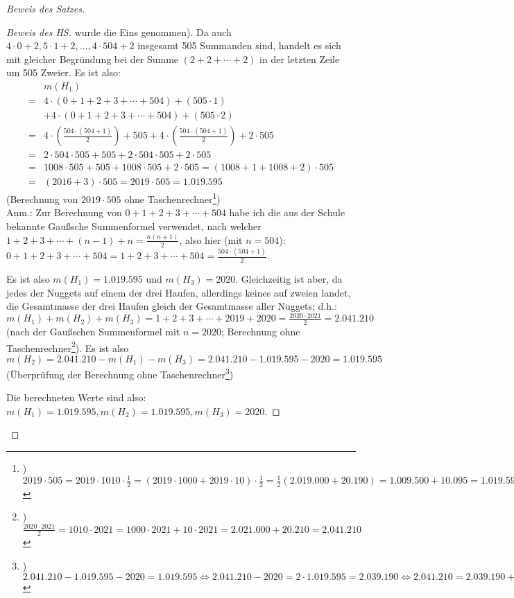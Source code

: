 \begin{proof}[Beweis des Satzes]
\begin{proof}[Beweis des HS]
        wurde die Eins genommen). Da auch $4\cdot0+2,5\cdot1+2,\ldots,4\cdot504+2$ insgesamt 505 Summanden sind, handelt es sich 
        mit gleicher Begründung bei der Summe $(2+2+\cdots+2)$ in der letzten Zeile um 505 Zweier. Es ist also:
        \begin{align*}
            &m(H_1)\\
            = &4\cdot(0+1+2+3+\cdots+504)+(505\cdot1)\\
            &+4\cdot(0+1+2+3+\cdots+504)+(505\cdot2)\\
            = &4\cdot\left(\frac{504\cdot(504+1)}{2}\right)+505
            +4\cdot\left(\frac{504\cdot(504+1)}{2}\right)+2\cdot 505\\
            =&2\cdot504\cdot505+505+2\cdot 504\cdot505+2\cdot505\\
            =&1008\cdot505+505+1008\cdot505+2\cdot505=(1008+1+1008+2)\cdot 505\\
            =&(2016+3)\cdot 505=2019\cdot505= 1.019.595
        \end{align*}
        (Berechnung von $2019\cdot 505$ ohne Taschenrechner\footnote{) $2019\cdot 505= 2019\cdot 1010 \cdot \frac12
        =(2019\cdot 1000+2019\cdot 10)\cdot \frac12=\frac12(2.019.000+20.190)=1.009.500+10.095=1.019.595$})\\
        Anm.: Zur Berechnung von $0+1+2+3+\cdots+504$ habe ich die aus der Schule bekannte Gaußsche Summenformel 
        verwendet, nach welcher $1+2+3+\cdots+(n-1)+n=\frac{n(n+1)}{2}$, also hier (mit $n=504$): 
        $0+1+2+3+\cdots+504=1+2+3+\cdots+504=\frac{504\cdot(504+1)}{2}$.

        Es ist also $m(H_1)= 1.019.595$ und $m(H_3)=2020$. Gleichzeitig ist aber, da jedes der Nuggets auf einem der 
        drei Haufen, allerdings keines auf zweien landet, die Gesamtmasse der drei Haufen gleich der Gesamtmasse 
        aller Nuggets; d.h.: $m(H_1)+m(H_2)+m(H_3)=1+2+3+\cdots+2019+2020=\frac{2020\cdot2021}{2}=2.041.210$ (nach der 
        Gaußschen Summenformel mit $n=2020$; Berechnung ohne Taschenrechner\footnote{) $\frac{2020\cdot2021}{2}=1010
        \cdot2021=1000\cdot2021+10\cdot2021=2.021.000+20.210=2.041.210$}). Es ist also $m(H_2)=2.041.210-m(H_1)-m(H_3) 
        = 2.041.210-1.019.595-2020=1.019.595$ (Überprüfung der Berechnung ohne Taschenrechner\footnote{) $2.041.210
        -1.019.595-2020=1.019.595\Leftrightarrow 2.041.210-2020=2\cdot 1.019.595=2.039.190\Leftrightarrow 2.041.210
        =2.039.190+2020=2.039.210+2000=2.041.210$})

        Die berechneten Werte sind also: $m(H_1)=1.019.595, m(H_2)=1.019.595, m(H_3)=2020$.


\end{proof}
\end{proof}

